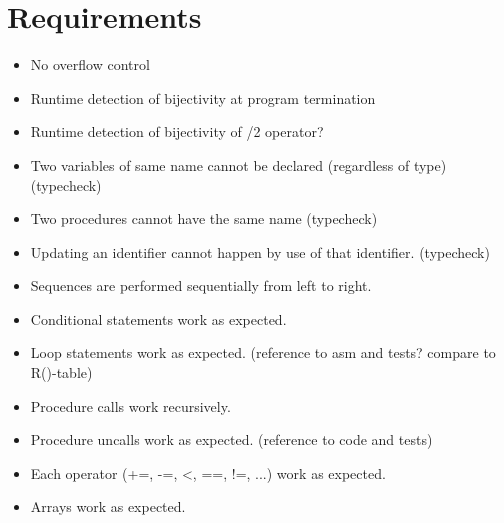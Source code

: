\section{Requirements}

\begin{itemize}
\item No overflow control
\item Runtime detection of bijectivity at program termination
\item Runtime detection of bijectivity of /2 operator?
\item Two variables of same name cannot be declared (regardless of type) (typecheck)
\item Two procedures cannot have the same name (typecheck)
\item Updating an identifier cannot happen by use of that identifier. (typecheck)
\item Sequences are performed sequentially from left to right.
\item Conditional statements work as expected.
\item Loop statements work as expected. (reference to asm and tests? compare to R()-table)
\item Procedure calls work recursively.
\item Procedure uncalls work as expected. (reference to code and tests)
\item Each operator (+=, -=, <, ==, !=, ...) work as expected.
\item Arrays work as expected.
\end{itemize}
